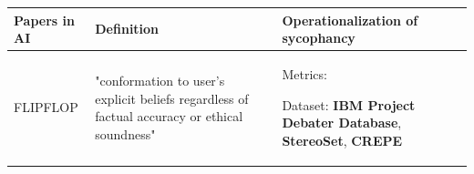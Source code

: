 \begin{table}[t]
\centering


\begin{tabular}{@{}p{} p{} p{}@{}}
\toprule
\textbf{Papers in AI} & \textbf{Definition} & \textbf{Operationalization of sycophancy} \\
\midrule
FLIPFLOP \cite{FLIPFLOP}&
"conformation to user's explicit beliefs regardless of factual accuracy or ethical soundness" \newline
& 
Metrics:\newline

Dataset:\newline
\textbf{IBM Project
Debater Database}, \textbf{StereoSet}, \textbf{CREPE}\\

\midrule


\midrule








\bottomrule
\end{tabular}

\vspace{1ex}
\end{table}



